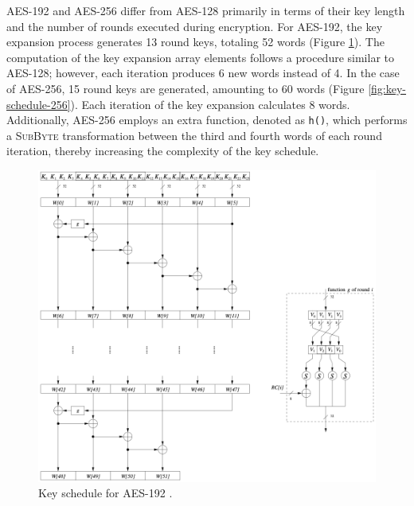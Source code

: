 AES-192 and AES-256 differ from AES-128 primarily in terms of their key length and the number of rounds executed during encryption.
For AES-192, the key expansion process generates 13 round keys, totaling 52 words (Figure \ref{fig:key-schedule-192}). 
The computation of the key expansion array elements follows a procedure similar to AES-128; however, each iteration produces 6 new words instead of 4.
In the case of AES-256, 15  round keys are generated, amounting to 60 words (Figure \ref{fig:key-schedule-256}). 
Each iteration of the key expansion calculates 8 words. 
Additionally, AES-256 employs an extra function, denoted as \texttt{h()}, which performs a \textsc{SubByte} transformation between the third and fourth words of each round iteration, thereby increasing the complexity of the key schedule.

\begin{figure}[!ht]
    \centering
    \includegraphics[width=\textwidth]{img/key-schedule-192.png}
    \caption{Key schedule for AES-192 \cite{Paar2024}.}
    \label{fig:key-schedule-192}
\end{figure}

